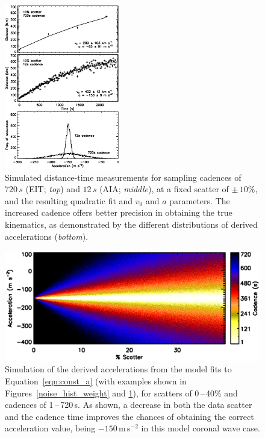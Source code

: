 \documentclass[structabstract]{aa}
\begin{document}
\begin{figure}[!t]
\begin{center}
\includegraphics[width = 0.45\textwidth]{images/cad_hist_weight.eps}
\caption{Simulated distance-time measurements for sampling cadences of $720\,s$ (EIT; \emph{top}) and $12\,s$ (AIA; \emph{middle}), at a fixed scatter of $\pm\,10\%$, and the resulting quadratic fit and $v_0$ and $a$ parameters. The increased cadence offers better precision in obtaining the true kinematics, as demonstrated by the different distributions of derived accelerations (\emph{bottom}).}
\label{cad_hist_weight}
\end{center}
\end{figure}

\begin{figure}[!b]
\begin{center}
\includegraphics[scale=0.53, trim=20 10 0 20]{images/fig_noise_cad.eps}
\caption{Simulation of the derived accelerations from the model fits to Equation~\ref{eqn:const_a} (with examples shown in Figures~\ref{noise_hist_weight} and \ref{cad_hist_weight}), for scatters of 0\,--\,40\% and cadences of 1\,--\,720\,s. As shown, a decrease in both the data scatter and the cadence time improves the chances of obtaining the correct acceleration value, being $-150$\,m\,s$^{-2}$ in this model coronal wave case.}
\label{noise_test_image}
\end{center}
\end{figure}
\end{document}

